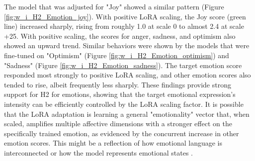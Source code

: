 \documentclass{DESSThesis}
\begin{document}
The model that was adjusted for "Joy" showed a similar pattern (Figure \ref{fig:w_i_H2_Emotion_joy}). With positive LoRA scaling, the Joy score (green line) increased sharply, rising from roughly 1.0 at scale 0 to almost 2.4 at scale +25. With positive scaling, the scores for anger, sadness, and optimism also showed an upward trend. Similar behaviors were shown by the models that were fine-tuned on "Optimism" (Figure \ref{fig:w_i_H2_Emotion_optimism}) and "Sadness" (Figure \ref{fig:w_i_H2_Emotion_sadness}). The target emotion score responded most strongly to positive LoRA scaling, and other emotion scores also tended to rise, albeit frequently less sharply. These findings provide strong support for H2 for emotions, showing that the target emotional expression's intensity can be efficiently controlled by the LoRA scaling factor. It is possible that the LoRA adaptation is learning a general "emotionality" vector that, when scaled, amplifies multiple affective dimensions with a stronger effect on the specifically trained emotion, as evidenced by the concurrent increase in other emotion scores. This might be a reflection of how emotional language is interconnected or how the model represents emotional states \cite{mozikov_good_2024, zhao_both_2024}.
\end{document}
